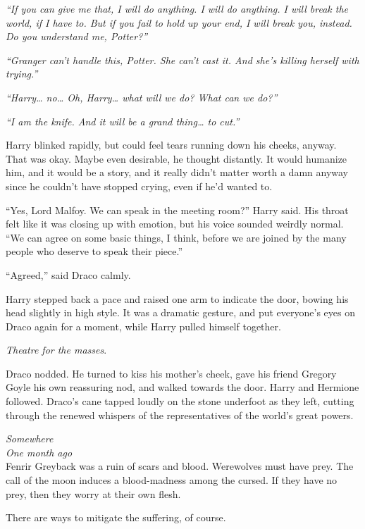 \emph{``If you can give me that, I will do anything. I will do anything.
I will break the world, if I have to. But if you fail to hold up your
end, I will break you, instead. Do you understand me, Potter?''}

\emph{``Granger can't handle this, Potter. She can't cast it. And she's
killing herself with trying.''}

\emph{``Harry\ldots{} no\ldots{} Oh, Harry\ldots{} what will we do? What
can we do?''}

\emph{``I am the knife. And it will be a grand thing\ldots{} to cut.''}

Harry blinked rapidly, but could feel tears running down his cheeks,
anyway. That was okay. Maybe even desirable, he thought distantly. It
would humanize him, and it would be a story, and it really didn't matter
worth a damn anyway since he couldn't have stopped crying, even if he'd
wanted to.

``Yes, Lord Malfoy. We can speak in the meeting room?'' Harry said. His
throat felt like it was closing up with emotion, but his voice sounded
weirdly normal. ``We can agree on some basic things, I think, before we
are joined by the many people who deserve to speak their piece.''

``Agreed,'' said Draco calmly.

Harry stepped back a pace and raised one arm to indicate the door,
bowing his head slightly in high style. It was a dramatic gesture, and
put everyone's eyes on Draco again for a moment, while Harry pulled
himself together.

\emph{Theatre for the masses}.

Draco nodded. He turned to kiss his mother's cheek, gave his friend
Gregory Goyle his own reassuring nod, and walked towards the door. Harry
and Hermione followed. Draco's cane tapped loudly on the stone underfoot
as they left, cutting through the renewed whispers of the
representatives of the world's great powers.

\mybreak

\emph{Somewhere}\\
\emph{One month ago}\\

Fenrir Greyback was a ruin of scars and blood. Werewolves must have
prey. The call of the moon induces a blood-madness among the cursed. If
they have no prey, then they worry at their own flesh.

There are ways to mitigate the suffering, of course.

